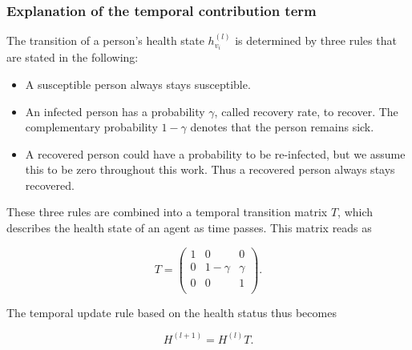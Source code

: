 \subsubsection{Explanation of the temporal contribution term}

The transition of a person's health state $h_{v_i}^{(l)}$ is determined by three rules that are stated in the following:

\begin{itemize}
	\item A susceptible person always stays susceptible.
	\item An infected person has a probability $\gamma$, called recovery rate, to recover. The complementary probability $1-\gamma$ denotes that the person remains sick.
	\item A recovered person could have a probability to be re-infected, but we assume this to be zero throughout this work. Thus a recovered person always stays recovered.
\end{itemize}

These three rules are combined into a temporal transition matrix $T$, which describes the health state of an agent as time passes. This matrix reads as

\begin{equation}
	T = 
	\begin{pmatrix}
		1 &     0    & 0      \\
		0 & 1-\gamma & \gamma \\
		0 &     0    & 1      \\
	\end{pmatrix}.
\end{equation}

The temporal update rule based on the health status thus becomes

\begin{equation}
	H^{(l+1)} = H^{(l)} T.
\end{equation}